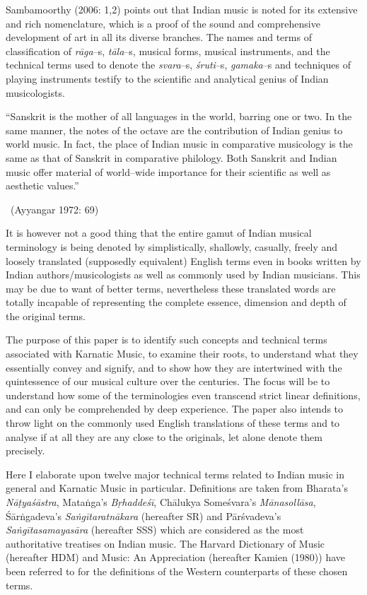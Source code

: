 Sambamoorthy (2006: 1,2) points out that Indian music is noted for its extensive and rich nomenclature, which is a proof of the sound and comprehensive development of art in all its diverse branches. The names and terms of classification of \textit{rāga}–s, \textit{tāla}–s, musical forms, musical instruments, and the technical terms used to denote the \textit{svara}–s, \textit{śruti}–s, \textit{gamaka}–s and techniques of playing instruments testify to the scientific and analytical genius of Indian musicologists.

\begin{myquote}
“Sanskrit is the mother of all languages in the world, barring one or two. In the same manner, the notes of the octave are the contribution of Indian genius to world music. In fact, the place of Indian music in comparative musicology is the same as that of Sanskrit in comparative philology. Both Sanskrit and Indian music offer material of world–wide importance for their scientific as well as aesthetic values.” 

~\hfill (Ayyangar 1972: 69)
\end{myquote}

It is however not a good thing that the entire gamut of Indian musical terminology is being denoted by simplistically, shallowly, casually, freely and loosely translated (supposedly equivalent) English terms even in books written by Indian authors/musicologists as well as commonly used by Indian musicians. This may be due to want of better terms, nevertheless these translated words are totally incapable of representing the complete essence, dimension and depth of the original terms. 

The purpose of this paper is to identify such concepts and technical terms associated with Karnatic Music, to examine their roots, to understand what they essentially convey and signify, and to show how they are intertwined with the quintessence of our musical culture over the centuries. The focus will be to understand how some of the terminologies even transcend strict linear definitions, and can only be comprehended by deep experience. The paper also intends to throw light on the commonly used English translations of these terms and to analyse if at all they are any close to the originals, let alone denote them precisely.

Here I elaborate upon twelve major technical terms related to Indian music in general and Karnatic Music in particular. Definitions are taken from Bharata’s \textit{Nāṭyaśāstra}, Mataṅga’s \textit{Bṛhaddeśī}, Chālukya Someśvara’s \textit{Mānasollāsa}, Śārṅgadeva’s \textit{Saṅgītaratnākara} (hereafter SR) and Pārśvadeva’s \textit{Saṅgītasamayasāra} (hereafter SSS) which are considered as the most authoritative treatises on Indian music. The Harvard Dictionary of Music (hereafter HDM) and Music: An Appreciation (hereafter Kamien (1980)) have been referred to for the definitions of the Western counterparts of these chosen terms.

